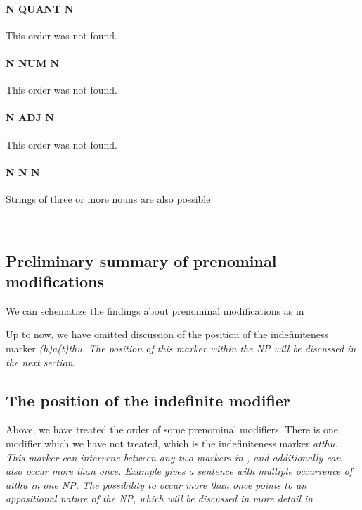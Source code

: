 \paragraph{N QUANT N}
This order was not found.
\paragraph{N NUM N}
This order was not found.
\paragraph{N ADJ N}
This order was not found.


\paragraph{N N N}
Strings of three or more nouns are also possible

\\

\subsection{Preliminary summary of prenominal modifications}\label{sec:nppp:Preliminarysummaryofprenominalmodifications}

We can schematize the findings about prenominal modifications as in 


Up to now, we have omitted discussion of the position of the indefiniteness marker \em (h)a(t)thu\em. The position of this marker within the NP will be discussed in the next section.

\subsection{The position of the indefinite modifier}\label{sec:nppp:Thepositionoftheindefinitemodifier}
Above, we have treated the order of some prenominal modifiers. There is one modifier which we have not treated, which is the indefiniteness marker \em atthu\em. This marker can intervene between any two markers in , and additionally can also occur more than once. Example  gives a sentence with multiple occurrence of \em atthu \em in one NP. The possibility to occur more than once points to an appositional nature of the NP, which will be discussed in more detail in .

